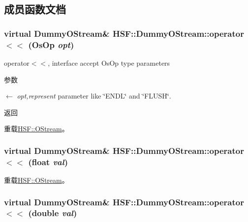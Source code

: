 \subsection{成员函数文档}
\hypertarget{classHSF_1_1DummyOStream_a7b609938f7a2d4304a463d6164c2ec3b}{
\subsubsection[{operator$<$$<$}]{\setlength{\rightskip}{0pt plus 5cm}virtual {\bf DummyOStream}\& HSF::DummyOStream::operator$<$$<$ ({\bf OsOp} {\em opt})}}
\label{classHSF_1_1DummyOStream_a7b609938f7a2d4304a463d6164c2ec3b}


operator$<$$<$, interface accept OsOp type parameters 
\begin{DoxyParams}{参数}
\item[\mbox{$\leftarrow$} {\em opt,represent}]parameter like \char`\"{}ENDL\char`\"{} and \char`\"{}FLUSH\char`\"{}. \end{DoxyParams}
\begin{DoxyReturn}{返回}

\end{DoxyReturn}


重载\hyperlink{classHSF_1_1OStream_aa7a6f8ac15aaa2145e23f92904350b39}{HSF::OStream}。\hypertarget{classHSF_1_1DummyOStream_af27eca0aa6a04ff2a0e86bc668d88dcd}{
\subsubsection[{operator$<$$<$}]{\setlength{\rightskip}{0pt plus 5cm}virtual {\bf DummyOStream}\& HSF::DummyOStream::operator$<$$<$ (float {\em val})}}
\label{classHSF_1_1DummyOStream_af27eca0aa6a04ff2a0e86bc668d88dcd}


重载\hyperlink{classHSF_1_1OStream_a26a658cc9ab9422d58252ef75a7ca360}{HSF::OStream}。\hypertarget{classHSF_1_1DummyOStream_a727be32ccd88ccaee0fae2e8d148e9b5}{
\subsubsection[{operator$<$$<$}]{\setlength{\rightskip}{0pt plus 5cm}virtual {\bf DummyOStream}\& HSF::DummyOStream::operator$<$$<$ (double {\em val})}}
\label{classHSF_1_1DummyOStream_a727be32ccd88ccaee0fae2e8d148e9b5}


